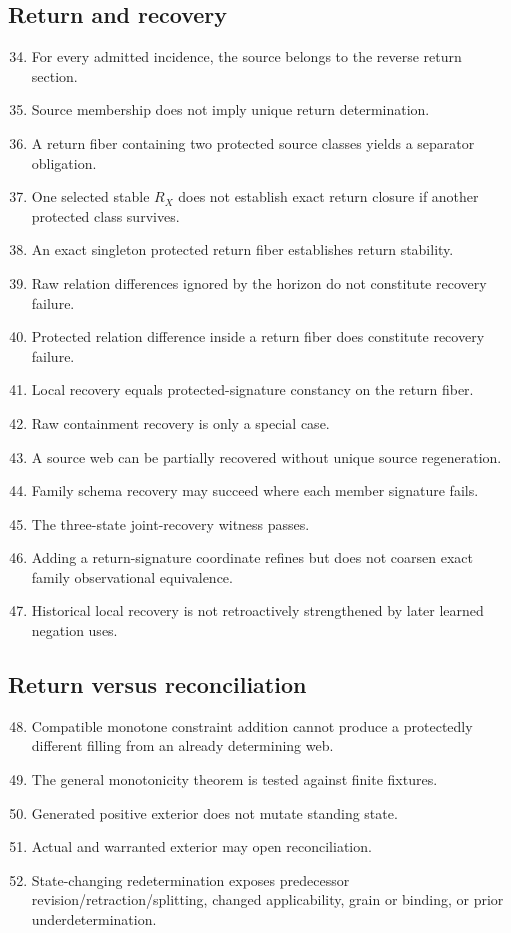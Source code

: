 \documentclass[11pt,oneside]{article}
\begin{document}
\subsection{Return and recovery}
\begin{enumerate}\setcounter{enumi}{33}
\item For every admitted incidence, the source belongs to the reverse return section.
\item Source membership does not imply unique return determination.
\item A return fiber containing two protected source classes yields a separator obligation.
\item One selected stable \(R_X\) does not establish exact return closure if another protected class survives.
\item An exact singleton protected return fiber establishes return stability.
\item Raw relation differences ignored by the horizon do not constitute recovery failure.
\item Protected relation difference inside a return fiber does constitute recovery failure.
\item Local recovery equals protected-signature constancy on the return fiber.
\item Raw containment recovery is only a special case.
\item A source web can be partially recovered without unique source regeneration.
\item Family schema recovery may succeed where each member signature fails.
\item The three-state joint-recovery witness passes.
\item Adding a return-signature coordinate refines but does not coarsen exact family observational equivalence.
\item Historical local recovery is not retroactively strengthened by later learned negation uses.
\end{enumerate}

\subsection{Return versus reconciliation}
\begin{enumerate}\setcounter{enumi}{47}
\item Compatible monotone constraint addition cannot produce a protectedly different filling from an already determining web.
\item The general monotonicity theorem is tested against finite fixtures.
\item Generated positive exterior does not mutate standing state.
\item Actual and warranted exterior may open reconciliation.
\item State-changing redetermination exposes predecessor revision/retraction/splitting, changed applicability, grain or binding, or prior underdetermination.
\end{enumerate}
\end{document}
